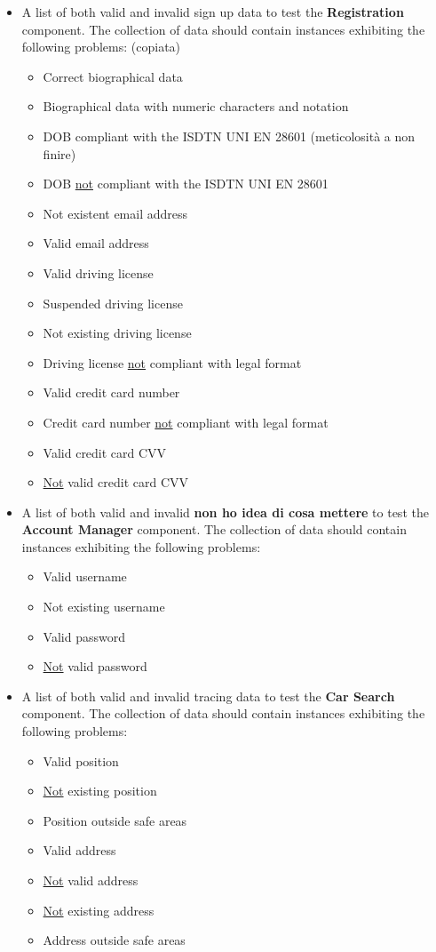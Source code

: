 \documentclass[english]{article}
\begin{document}
\begin{itemize}
  \item{A list of both valid and invalid sign up data to test the \textbf{Registration} component.
  The collection of data should contain instances exhibiting the following problems: (copiata)
    \begin{itemize}
      \item{Correct biographical data}
      \item{Biographical data with numeric characters and notation}
      \item{DOB compliant with the ISDTN UNI EN 28601} (meticolosità a non finire)
      \item{DOB \underline{not} compliant with the ISDTN UNI EN 28601}
      \item{Not existent email address}
      \item{Valid email address}
      \item{Valid driving license}
      \item{Suspended driving license}
      \item{Not existing driving license}
      \item{Driving license \underline{not} compliant with legal format}
      \item{Valid credit card number}
      \item{Credit card number \underline{not} compliant with legal format}
      \item{Valid credit card CVV}
      \item{\underline{Not} valid credit card CVV}
    \end{itemize}}

    \item{A list of both valid and invalid \textbf{non ho idea di cosa mettere} to test the \textbf{Account Manager} component.
    The collection of data should contain instances exhibiting the following problems:
    \begin{itemize}
      \item{Valid username}
      \item{Not existing username}
      \item{Valid password}
      \item{\underline{Not} valid password}
    \end{itemize}}

    \item{A list of both valid and invalid tracing data to test the \textbf{Car Search} component.
    The collection of data should contain instances exhibiting the following problems:
    \begin{itemize}
      \item{Valid position}
      \item{\underline{Not} existing position}
      \item{Position outside safe areas}
      \item{Valid address}
      \item{\underline{Not} valid address}
      \item{\underline{Not} existing address}
      \item{Address outside safe areas}
    \end{itemize}}


\end{itemize}
\end{document}
